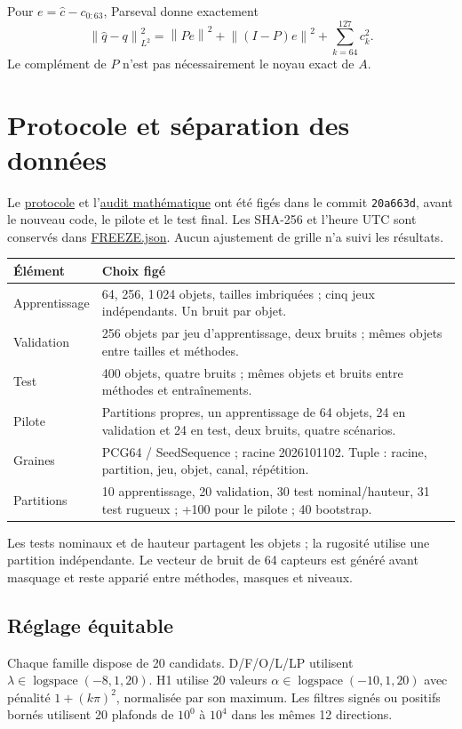 \documentclass[11pt,a4paper]{article}
\newcommand{\norm}[1]{\left\lVert#1\right\rVert}
\newcommand{\src}[2]{\href{\DataURL{#1}}{#2}}
\begin{document}
Pour $e=\widehat c-c_{0:63}$, Parseval donne exactement
\[
 \norm{\widehat q-q}_{L^2}^2=\norm{Pe}^2+\norm{(I-P)e}^2+\sum_{k=64}^{127}c_k^2.
\]
Le complément de $P$ n'est pas nécessairement le noyau exact de $A$.

\newpage
\section{Protocole et séparation des données}\label{protocol}
Le \src{PROTOCOL.md}{protocole} et l'\src{MATHEMATICS.md}{audit mathématique} ont été figés dans le commit \texttt{20a663d}, avant le nouveau code, le pilote et le test final. Les SHA-256 et l'heure UTC sont conservés dans \src{FREEZE.json}{FREEZE.json}. Aucun ajustement de grille n'a suivi les résultats.

\begin{center}
\begin{tabular}{lp{10cm}}
\toprule Élément & Choix figé\\\midrule
Apprentissage & 64, 256, 1\,024 objets, tailles imbriquées ; cinq jeux indépendants. Un bruit par objet.\\
Validation & 256 objets par jeu d'apprentissage, deux bruits ; mêmes objets entre tailles et méthodes.\\
Test & 400 objets, quatre bruits ; mêmes objets et bruits entre méthodes et entraînements.\\
Pilote & Partitions propres, un apprentissage de 64 objets, 24 en validation et 24 en test, deux bruits, quatre scénarios.\\
Graines & PCG64 / SeedSequence ; racine 2026101102. Tuple : racine, partition, jeu, objet, canal, répétition.\\
Partitions & 10 apprentissage, 20 validation, 30 test nominal/hauteur, 31 test rugueux ; +100 pour le pilote ; 40 bootstrap.\\\bottomrule
\end{tabular}
\end{center}

Les tests nominaux et de hauteur partagent les objets ; la rugosité utilise une partition indépendante. Le vecteur de bruit de 64 capteurs est généré avant masquage et reste apparié entre méthodes, masques et niveaux.

\subsection{Réglage équitable}
Chaque famille dispose de 20 candidats. D/F/O/L/LP utilisent $\lambda\in\operatorname{logspace}(-8,1,20)$. H1 utilise 20 valeurs $\alpha\in\operatorname{logspace}(-10,1,20)$ avec pénalité $1+(k\pi)^2$, normalisée par son maximum. Les filtres signés ou positifs bornés utilisent 20 plafonds de $10^0$ à $10^4$ dans les mêmes 12 directions.
\end{document}

